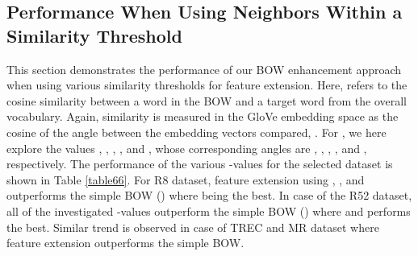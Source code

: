 \documentclass[11pt]{article}
\begin{document}
\begin{comment}

\begin{figure}[h]
    \centering
    \texttt{[image: Figures/R8.pdf]}
    \caption{Epoch-wise test accuracy based on various -values for R8.}
    \label{fig6}
\end{figure}

\begin{figure}[h]
    \centering
    
    \texttt{[image: Figures/R52.pdf]}
    \caption{Epoch-wise test accuracy based on various -values for R52.}
    \label{fig7}
\end{figure}

\begin{figure}[h]
    \centering
    \texttt{[image: Figures/trec.pdf]}
    \caption{Epoch-wise test accuracy based on various -values for TREC.}
    \label{fig8}
\end{figure}

\begin{figure}[h]
    \centering
    \texttt{[image: Figures/MR.pdf]}
    \caption{Epoch-wise test accuracy based on various -values for MR.}
    \label{fig9}
\end{figure}

\end{comment}

\subsection{Performance When Using Neighbors Within a Similarity Threshold}
This section demonstrates the performance of our BOW enhancement approach  when using various similarity thresholds  for feature extension. Here,  refers to the cosine similarity between a word in the BOW and a target word from the overall vocabulary. Again, similarity is measured in the GloVe embedding  space as  the cosine of the angle  between the embedding vectors compared, . For , we here explore the  values , , , , and , whose corresponding angles are , , , , and , respectively. The performance of the various -values for the selected dataset is shown in Table \ref{table66}. For R8 dataset, feature extension using , , and  outperforms the simple BOW () where  being the best. In case of the R52 dataset, all of the investigated -values outperform the simple BOW () where  and  performs the best. Similar trend is observed in case of TREC and MR dataset where feature extension outperforms the simple BOW.
\end{document}
